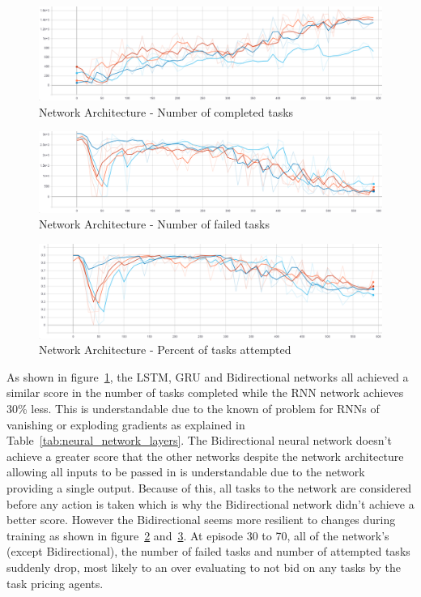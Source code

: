 \begin{figure}[H]
    \centering
    \includegraphics[width=\linewidth]{figures/5_evaluation_figs/net_arch_training_fig/num_completed_tasks.PNG}
    \caption{Network Architecture - Number of completed tasks}
    \label{fig:net_arch_num_completed_tasks}
\end{figure}

\begin{figure}[H]
    \centering
    \includegraphics[width=\linewidth]{figures/5_evaluation_figs/net_arch_training_fig/num_failed_tasks.png}
    \caption{Network Architecture - Number of failed tasks}
    \label{fig:net_arch_num_failed_tasks}
\end{figure}

\begin{figure}[H]
    \centering
    \includegraphics[width=\linewidth]{figures/5_evaluation_figs/net_arch_training_fig/percent_tasks.png}
    \caption{Network Architecture - Percent of tasks attempted}
    \label{fig:net_arch_percent_tasks}
\end{figure}

As shown in figure~\ref{fig:net_arch_num_completed_tasks}, the LSTM, GRU and Bidirectional networks all achieved a
similar score in the number of tasks completed while the RNN network achieves 30\% less. This is understandable due to
the known of problem for RNNs of vanishing or exploding gradients as explained in Table~\ref{tab:neural_network_layers}.
The Bidirectional neural network doesn't achieve a greater score that the other networks despite the network
architecture allowing all inputs to be passed in is understandable due to the network providing a single output.
Because of this, all tasks to the network are considered before any action is taken which is why the Bidirectional
network didn't achieve a better score. However the Bidirectional seems more resilient to changes during training as
shown in figure~\ref{fig:net_arch_num_failed_tasks} and~\ref{fig:net_arch_percent_tasks}. At episode 30 to 70, all
of the network's (except Bidirectional), the number of failed tasks and number of attempted tasks suddenly drop, most
likely to an over evaluating to not bid on any tasks by the task pricing agents.
